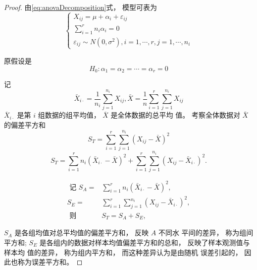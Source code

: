 \begin{proof}
    由\cref{eq:anovaDecomposition}式， 模型可表为
    \begin{equation}
    \left\{\begin{array}{l}
    {X}_{i j}=\mu+\alpha_{i}+\varepsilon_{i j} \\
    \sum_{i=1}^{r} {n}_{i} \alpha_{i}={0} \\
    \varepsilon_{i j} \sim N\left({0}, \sigma^{2}\right), i=1, \cdots, r, j=1, \cdots, n_{i}
    \end{array}\right.
    \end{equation}
    
    原假设是
    \begin{equation}
    H_{0}: \alpha_{1}=\alpha_{2}=\cdots=\alpha_{r}=0
    \end{equation}
    
    记
    \begin{equation}
    \bar{X}_{i \cdot}=\frac{1}{n_{i}} \sum_{j=1}^{n_{i}} X_{i j}, \bar{X}=\frac{1}{n} \sum_{i=1}^{r} \sum_{j=1}^{n_{i}} X_{i j}
    \end{equation}
    $  \overline{{X}}_{{i} \cdot}  $ 是第 $  {i}  $ 组数据的组平均值， $  \overline{{X}}  $ 是全体数据的总平均
    值。 考察全体数据对 $  \bar{X}  $ 的偏差平方和
    \begin{equation}
    S_{T}=\sum_{i=1}^{r} \sum_{j=1}^{n_{i}}\left(X_{i j}-\bar{X}\right)^{2}
    \end{equation}
    \begin{equation}
    S_{T}=\sum_{i=1}^{r} n_{i}\left(\bar{X}_{i \cdot}-\bar{X}\right)^{2}+\sum_{i=1}^{r} \sum_{j=1}^{n_{i}}\left(X_{i j}-\bar{X}_{i \cdot}\right)^{2} .
    \end{equation}
    
    \begin{equation} \begin{aligned} \text { 记 } S_{A}=& \sum_{i=1}^{r} n_{i}\left(\bar{X}_{i \cdot}-\bar{X}\right)^{2}, \\ S_{E}=& \sum_{i=1}^{r} \sum_{j=1}^{n_{i}}\left(X_{i j}-\bar{X}_{i \cdot}\right)^{2}, \\ \text { 则 } & S_{T}=S_{A}+S_{E}, \end{aligned} \end{equation}
    
    $  {S}_{{A}}  $ 是各组均值对总平均值的偏差平方和， 反映 $  {A}  $ 不同水
    平间的差异， 称为组间平方和; $  {S}_{E}  $ 是各组内的数据对样本均值偏差平方和的总和， 反映了样本观测值与样本均
    值的差异， 称为组内平方和， 而这种差异认为是由随机
    误差引起的， 因此也称为误差平方和。 
    

\end{proof}
